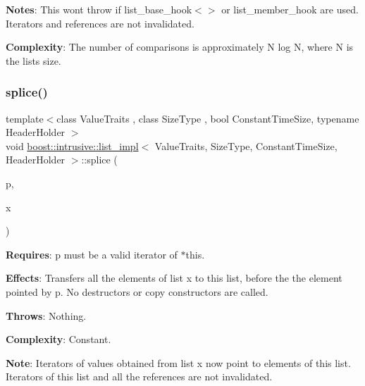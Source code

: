 {\bfseries Notes}\+: This won\textquotesingle{}t throw if list\+\_\+base\+\_\+hook$<$$>$ or list\+\_\+member\+\_\+hook are used. Iterators and references are not invalidated.

{\bfseries Complexity}\+: The number of comparisons is approximately N log N, where N is the list\textquotesingle{}s size. \mbox{\label{classboost_1_1intrusive_1_1list__impl_a458f433ae6990732b006544cb26f3cf2}} 
\subsubsection{\texorpdfstring{splice()}{splice()}\hspace{0.1cm}{\footnotesize\ttfamily [1/4]}}
{\footnotesize\ttfamily template$<$class Value\+Traits , class Size\+Type , bool Constant\+Time\+Size, typename Header\+Holder $>$ \\
void \hyperlink{classboost_1_1intrusive_1_1list__impl}{boost\+::intrusive\+::list\+\_\+impl}$<$ Value\+Traits, Size\+Type, Constant\+Time\+Size, Header\+Holder $>$\+::splice (\begin{DoxyParamCaption}\item[{\hyperlink{classboost_1_1intrusive_1_1list__impl_af4ced710fe02662c5650d161af83d8cd}{const\+\_\+iterator}}]{p,  }\item[{\hyperlink{classboost_1_1intrusive_1_1list__impl}{list\+\_\+impl}$<$ Value\+Traits, Size\+Type, Constant\+Time\+Size, Header\+Holder $>$ \&}]{x }\end{DoxyParamCaption})\hspace{0.3cm}{\ttfamily [inline]}}

{\bfseries Requires}\+: p must be a valid iterator of $\ast$this.

{\bfseries Effects}\+: Transfers all the elements of list x to this list, before the the element pointed by p. No destructors or copy constructors are called.

{\bfseries Throws}\+: Nothing.

{\bfseries Complexity}\+: Constant.

{\bfseries Note}\+: Iterators of values obtained from list x now point to elements of this list. Iterators of this list and all the references are not invalidated. \mbox{\label{classboost_1_1intrusive_1_1list__impl_a7d78b95611893de6779df06307a7ccb0}} 

